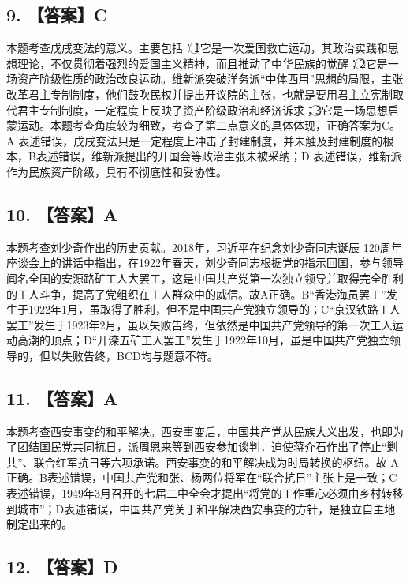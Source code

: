 \documentclass[UTF8,11pt]{ctexart}
\begin{document}
\subsection*{9. 【答案】C}

本题考查戊戌变法的意义。主要包括：\textcircled{1}它是一次爱国救亡运动，其政治实践和思想理论，不仅贯彻着强烈的爱国主义精神，而且推动了中华民族的觉醒；\textcircled{2}它是一场资产阶级性质的政治改良运动。维新派突破洋务派“中体西用”思想的局限，主张改革君主专制制度，他们鼓吹民权并提出开议院的主张，也就是要用君主立宪制取代君主专制制度，一定程度上反映了资产阶级政治和经济诉求；\textcircled{3}它是一场思想启蒙运动。本题考查角度较为细致，考查了第二点意义的具体体现，正确答案为C。A 表述错误，戊戌变法只是一定程度上冲击了封建制度，并未触及封建制度的根本，B表述错误，维新派提出的开国会等政治主张未被采纳；D 表述错误，维新派作为民族资产阶级，具有不彻底性和妥协性。


\subsection*{10. 【答案】A}

本题考查刘少奇作出的历史贡献。2018年，习近平在纪念刘少奇同志诞辰 120周年座谈会上的讲话中指出，在1922年春天，刘少奇同志根据党的指示回国，参与领导闻名全国的安源路矿工人大罢工，这是中国共产党第一次独立领导并取得完全胜利的工人斗争，提高了党组织在工人群众中的威信。故A正确。B“香港海员罢工”发生于1922年1月，虽取得了胜利，但不是中国共产党独立领导的；C“京汉铁路工人罢工”发生于1923年2月，虽以失败告终，但依然是中国共产党领导的第一次工人运动高潮的顶点；D“开滦五矿工人罢工”发生于1922年10月，虽是中国共产党独立领导的，但以失败告终，BCD均与题意不符。


\subsection*{11. 【答案】A}

本题考查西安事变的和平解决。西安事变后，中国共产党从民族大义出发，也即为了团结国民党共同抗日，派周恩来等到西安参加谈判，迫使蒋介石作出了停止“剿共”、联合红军抗日等六项承诺。西安事变的和平解决成为时局转换的枢纽。故 A正确。B表述错误，中国共产党和张、杨两位将军在“联合抗日”主张上是一致；C表述错误，1949年3月召开的七届二中全会才提出“将党的工作重心必须由乡村转移到城市”；D表述错误，中国共产党关于和平解决西安事变的方针，是独立自主地制定出来的。


\subsection*{12. 【答案】D}
\end{document}
